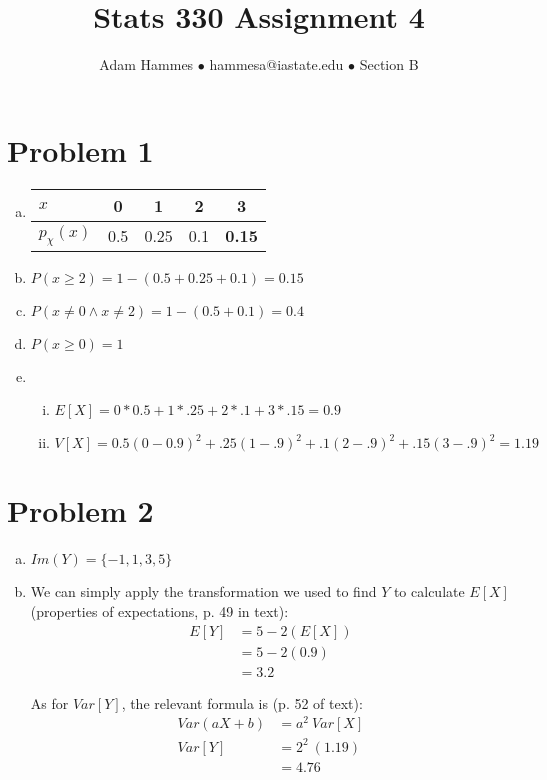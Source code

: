 \documentclass[11pt]{article}
\begin{document}
\title{Stats 330 Assignment 4}
\author{Adam Hammes $\bullet$ hammesa@iastate.edu $\bullet$ Section B}
\maketitle

\section*{Problem 1}
\begin{enumerate}[(a)]
	\item
	\begin{tabular}{l| c c c c|}
		$x$ & 0 & 1 & 2 & 3 \\
		\hline
		$p_{\chi}(x)$ & 0.5 & 0.25 & 0.1 & \textbf{0.15}\\
	\end{tabular}

	\item $P ( x \ge 2) = 1 - (0.5 + 0.25 + 0.1 ) = 0.15$
	
	\item $P ( x \neq 0 \wedge x \neq 2 ) = 1 - (0.5 + 0.1 ) = 0.4$
	
	\item $P ( x \ge 0 ) = 1$
	
	\item
	\begin{enumerate}[i.]
		\item $E[X] = 0 * 0.5 + 1 * .25 + 2 * .1 + 3 * .15 = 0.9$
		
		\item $V[X] = 0.5(0 - 0.9)^2 + .25(1-.9)^2+ .1(2-.9)^2  + .15(3-.9)^2 = 1.19$
	\end{enumerate}
\end{enumerate}


\section*{Problem 2}
\begin{enumerate}[(a)]
	\item $Im(Y) = \{-1, 1, 3, 5\}$
	
	\item We can simply apply the transformation we used to find $Y$ to calculate $E[X]$ (properties of expectations, p. 49 in text):
		\begin{align*}
		E[Y] &= 5 - 2( E[X] ) \\
		&= 5 - 2( 0.9 ) \\
		&= 3.2
		\end{align*}
		
		As for $Var[Y]$, the relevant formula is (p. 52 of text):
		\begin{align*}
			Var(aX + b) &= a^2\ Var[X] \\
			Var[Y] &= 2^2\ (1.19) \\
			&= 4.76
		\end{align*}
\end{enumerate}
		
\end{document}
